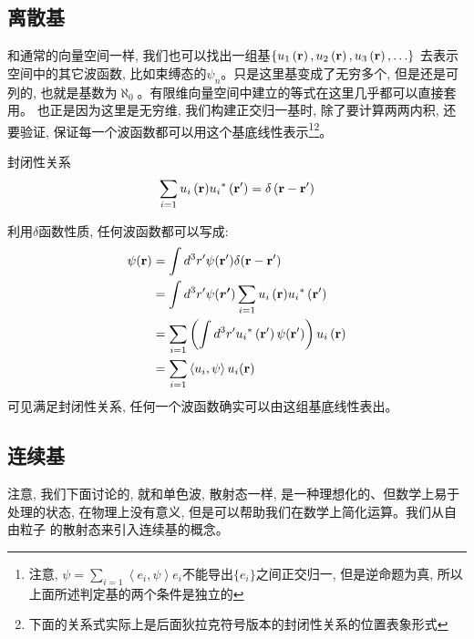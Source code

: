 \subsection*{离散基}
和通常的向量空间一样, 我们也可以找出一组基$\{{u_1}\left( {\bf{r}} \right),{u_2}\left( {\bf{r}} \right),{u_3}\left( {\bf{r}} \right),\ldots\}$
去表示空间中的其它波函数, 比如束缚态的$\psi_n$。只是这里基变成了无穷多个, 但是还是可列的, 也就是基数为${\aleph _0}$。有限维向量空间中建立的等式在这里几乎都可以直接套用。
也正是因为这里是无穷维, 我们构建正交归一基时, 除了要计算两两内积, 还要验证, 保证每一个波函数都可以用这个基底线性表示\footnote[1]{注意, $\psi=\sum\limits_{i = 1}\left\langle{e_i,\psi}\right\rangle e_i$不能导出$\{e_i\}$之间正交归一, 但是逆命题为真, 所以上面所述判定基的两个条件是独立的}\footnote[2]{下面的关系式实际上是后面狄拉克符号版本的封闭性关系的位置表象形式}。
\begin{proposition}{封闭性关系}
    \begin{equation}
        \sum\limits_{i = 1}{{u_i}\left( {\bf{r}} \right)} {u_i}^*\left( {\bf{r^\prime}} \right) = \delta \left( {{\bf{r}} - {\bf{r^\prime}}} \right)
    \end{equation}
\end{proposition}
\begin{thinknote}
    利用$\delta$函数性质, 任何波函数都可以写成:
    \begin{align*}
        \psi(\bf{r}) & = \int d^3r^\prime \psi(\bf{r^\prime})\delta({\bf{r}-\bf{r^\prime}})\\ 
        & = \int d^3r^\prime \psi(\bm{r^\prime})\sum\limits_{i = 1}{{u_i}\left( {\bf{r}} \right)} {u_i}^*\left( {\bf{r^\prime}} \right)\\
        &=\sum\limits_{i = 1}\left(\int d^3r^\prime {u_i}^*\left( {\bf{r^\prime}} \right) \psi(\bf{r^\prime})\right){{u_i}\left( {\bf{r}} \right)}\\
        &=\sum\limits_{i = 1}\left\langle{u_i,\psi}\right\rangle u_i(\bf{r})
    \end{align*}
    可见满足封闭性关系, 任何一个波函数确实可以由这组基底线性表出。
\end{thinknote}
\subsection*{连续基}
注意, 我们下面讨论的, 就和单色波, 散射态一样, 是一种理想化的、但数学上易于处理的状态, 在物理上没有意义, 但是可以帮助我们在数学上简化运算。我们从自由粒子
的散射态来引入连续基的概念。

